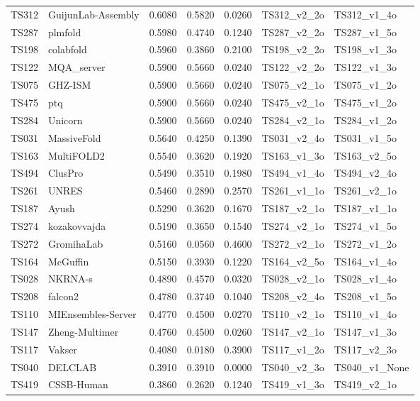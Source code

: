 \begin{table}[ht]
{\begin{tabular}{llrrrll}
TS312 & GuijunLab-Assembly & 0.6080 & 0.5820 & 0.0260 & TS312\_v2\_2o & TS312\_v1\_4o \\ 
TS287 & plmfold & 0.5980 & 0.4740 & 0.1240 & TS287\_v2\_2o & TS287\_v1\_5o \\ 
TS198 & colabfold & 0.5960 & 0.3860 & 0.2100 & TS198\_v2\_2o & TS198\_v1\_3o \\ 
TS122 & MQA\_server & 0.5900 & 0.5660 & 0.0240 & TS122\_v2\_2o & TS122\_v1\_3o \\ 
TS075 & GHZ-ISM & 0.5900 & 0.5660 & 0.0240 & TS075\_v2\_1o & TS075\_v1\_2o \\ 
TS475 & ptq & 0.5900 & 0.5660 & 0.0240 & TS475\_v2\_1o & TS475\_v1\_2o \\ 
TS284 & Unicorn & 0.5900 & 0.5660 & 0.0240 & TS284\_v2\_1o & TS284\_v1\_2o \\ 
TS031 & MassiveFold & 0.5640 & 0.4250 & 0.1390 & TS031\_v2\_4o & TS031\_v1\_5o \\ 
TS163 & MultiFOLD2 & 0.5540 & 0.3620 & 0.1920 & TS163\_v1\_3o & TS163\_v2\_5o \\ 
TS494 & ClusPro & 0.5490 & 0.3510 & 0.1980 & TS494\_v1\_4o & TS494\_v2\_4o \\ 
TS261 & UNRES & 0.5460 & 0.2890 & 0.2570 & TS261\_v1\_1o & TS261\_v2\_1o \\ 
TS187 & Ayush & 0.5290 & 0.3620 & 0.1670 & TS187\_v2\_1o & TS187\_v1\_1o \\ 
TS274 & kozakovvajda & 0.5190 & 0.3650 & 0.1540 & TS274\_v2\_1o & TS274\_v1\_5o \\ 
TS272 & GromihaLab & 0.5160 & 0.0560 & 0.4600 & TS272\_v2\_1o & TS272\_v1\_2o \\ 
TS164 & McGuffin & 0.5150 & 0.3930 & 0.1220 & TS164\_v2\_5o & TS164\_v1\_4o \\ 
TS028 & NKRNA-s & 0.4890 & 0.4570 & 0.0320 & TS028\_v2\_1o & TS028\_v1\_4o \\ 
TS208 & falcon2 & 0.4780 & 0.3740 & 0.1040 & TS208\_v2\_4o & TS208\_v1\_5o \\ 
TS110 & MIEnsembles-Server & 0.4770 & 0.4500 & 0.0270 & TS110\_v2\_1o & TS110\_v1\_4o \\ 
TS147 & Zheng-Multimer & 0.4760 & 0.4500 & 0.0260 & TS147\_v2\_1o & TS147\_v1\_3o \\ 
TS117 & Vakser & 0.4080 & 0.0180 & 0.3900 & TS117\_v1\_2o & TS117\_v2\_3o \\ 
TS040 & DELCLAB & 0.3910 & 0.3910 & 0.0000 & TS040\_v2\_3o & TS040\_v1\_None \\ 
TS419 & CSSB-Human & 0.3860 & 0.2620 & 0.1240 & TS419\_v1\_3o & TS419\_v2\_1o \\ 

\end{tabular}}
\end{table}
